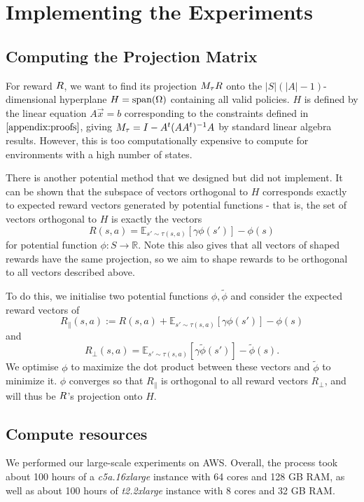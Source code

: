 \section{Implementing the Experiments}\label{appendix: experimental details}

\subsection{Computing the Projection Matrix}

For reward $R$, we want to find its projection $M_\tau R$ onto the $|S|(|A| - 1)$-dimensional hyperplane $H = \text{span}(\Omega)$ containing all valid policies. $H$ is defined by the linear equation $A\vec{x} = b$ corresponding to the constraints defined in $\cref{appendix:proofs}$, giving $M_\tau = I-A^t(AA^t)^{-1}A$ by standard linear algebra results. However, this is too computationally expensive to compute for environments with a high number of states. 

There is another potential method that we designed but did not implement. It can be shown that the subspace of vectors orthogonal to $H$ corresponds exactly to expected reward vectors generated by potential functions - that is, the set of vectors orthogonal to $H$ is exactly the vectors $$R(s, a) = \mathbb{E}_{s' \sim \tau(s, a)}[\gamma \phi(s')]-\phi(s)$$ for potential function $\phi:S \to \mathbb{R}$. Note this also gives that all vectors of shaped rewards have the same projection, so we aim to shape rewards to be orthogonal to all vectors described above.

To do this, we initialise two potential functions $\phi, \tilde{\phi}$ and consider the expected reward vectors of 
$$
R_{\parallel}(s, a) := R(s, a)+\mathbb{E}_{s' \sim \tau(s, a)}[\gamma \phi(s')]-\phi(s)$$ and $$R_{\perp}(s, a)=\mathbb{E}_{s' \sim \tau(s, a)}[\gamma \tilde{\phi}(s')]-\tilde{\phi}(s).
$$ 
We optimise $\phi$ to maximize the dot product between these vectors and $\tilde{\phi}$ to minimize it. $\phi$ converges so that $R_{\parallel}$ is orthogonal to all reward vectors $R_{\perp}$, and will thus be $R$'s projection onto $H$.

\subsection{Compute resources}

We performed our large-scale experiments on AWS. Overall, the process took about 100 hours of a \emph{c5a.16xlarge} instance with 64 cores and 128 GB RAM, as well as about 100 hours of \emph{t2.2xlarge} instance with 8 cores and 32 GB RAM.